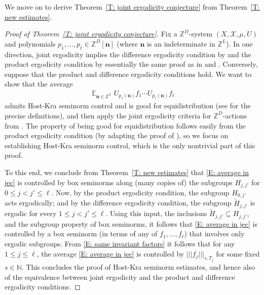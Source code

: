 \documentclass[11pt]{amsart}
\theoremstyle{definition}
\DeclareMathOperator*{\E}{\mathbb{E}}
\newcommand{\N}{{\mathbb N}}
\newcommand{\Z}{{\mathbb Z}}
\newcommand{\CX}{{\mathcal X}}
\newcommand{\bn}{{\mathbf{n}}}
\newcommand{\nnorm}[1]{\lvert\!|\!| #1|\!|\!\rvert}
\newcommand{\1}{{\mathbf{1}}}
\begin{document}
We move on to derive Theorem~\ref{T: joint ergodicity conjecture} from Theorem~\ref{T: new estimates}.
\begin{proof}[Proof of Theorem~\ref{T: joint ergodicity conjecture}]
    Fix a $\Z^D$-system $(X, \CX, \mu, U)$ and polynomials $p_1, \ldots, p_\ell\in\Z^D[\bn]$ (where $\bn$ is an indeterminate in $\Z^L$). In one direction, joint ergodicity implies the difference ergodicity condition by \cite[Proposition~6.2]{DFKS22} and the product ergodicity condition by essentially the same proof as in \cite[Proposition~6.2]{DFKS22} and \cite[Lemma~12.6]{DKKST24}. Conversely, suppose that the product and difference ergodicity conditions hold. We want to show that the average
    \begin{align}\label{E: average in jec}
        \E_{\bn\in\Z^L}U_{p_1(\bn)}f_1\cdots U_{p_\ell(\bn)}f_\ell
    \end{align}
    admits Host-Kra seminorm control and is good for equidistribution (see \cite[Section 1.1]{BFM22} for the precise definitions), and then apply the joint ergodicity criteria for $\Z^D$-actions from \cite[Theorem~1.1]{BFM21}. The property of being good for equidistribution follows easily from the product ergodicity condition (by adapting the proof of \cite[Corollary 12.5]{DKKST24}), so we focus on establishing Host-Kra seminorm control, which is the only nontrivial part of this proof.
    
    To this end, we conclude from Theorem~\ref{T: new estimates} that \eqref{E: average in jec} is controlled by box seminorms along (many copies of) the subgroups $H_{j,{j'}}$ for $0\leq j<{j'}\leq \ell$. Now, by the product ergodicity condition, the subgroup $H_{0,j'}$ acts ergodically; and by the difference ergodicity condition, the subgroup $\tilde H_{j,j'}$ is ergodic for every $1\leq j<j'\leq \ell$. Using this input, the inclusions $\tilde H_{j,j'}\subseteq H_{j,j'}$, and the subgroup property of box seminorms, it follows that \eqref{E: average in jec} is controlled by a box seminorm (in terms of any of $f_1, \ldots, f_\ell$) that involves only ergodic subgroups. 
    From \eqref{E: same invariant factors} it follows that for any $1\leq j\leq \ell$, the average \eqref{E: average in jec} is controlled by $\nnorm{f_j}_{s,T_j}$ for some fixed $s\in\N$. This concludes the proof of Host-Kra seminorm estimates, and hence also of the equivalence between joint ergodicity and the product and difference ergodicity conditions.
\end{proof}
\end{document}
